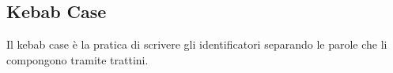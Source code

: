 
\subsection*{Kebab Case}
Il kebab case è la pratica di scrivere gli identificatori separando le parole che li compongono tramite trattini.

